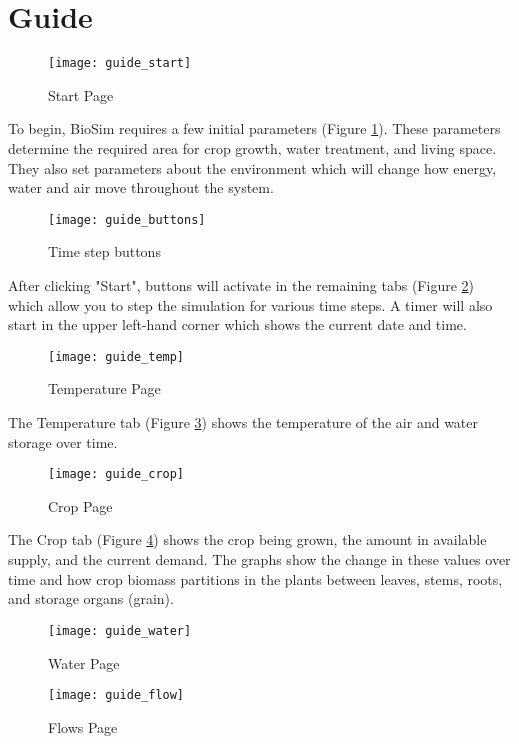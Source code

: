 \part{Guide}
\begin{figure}[h]
    \centering
    \texttt{[image: guide\_start]}
    \caption{Start Page}
    \label{fig:guide_start}
\end{figure}
To begin, BioSim requires a few initial parameters (Figure \ref{fig:guide_start}). These parameters determine the required area for crop growth, water treatment, and living space. They also set parameters about the environment which will change how energy, water and air move throughout the system. 

\begin{figure}[p]
    \centering
    \texttt{[image: guide\_buttons]}
    \caption{Time step buttons}
    \label{fig:guide_buttons}
\end{figure}

After clicking "Start", buttons will activate in the remaining tabs (Figure \ref{fig:guide_buttons}) which allow you to step the simulation for various time steps. A timer will also start in the upper left-hand corner which shows the current date and time.

\begin{figure}[p]
    \centering
    \texttt{[image: guide\_temp]}
    \caption{Temperature Page}
    \label{fig:guide_temp}
\end{figure}

The Temperature tab (Figure \ref{fig:guide_temp}) shows the temperature of the air and water storage over time.

\begin{figure}[p]
    \centering
    \texttt{[image: guide\_crop]}
    \caption{Crop Page}
    \label{fig:guide_crop}
\end{figure}

The Crop tab (Figure \ref{fig:guide_crop}) shows the crop being grown, the amount in available supply, and the current demand. The graphs show the change in these values over time and how crop biomass partitions in the plants between leaves, stems, roots, and storage organs (grain).

\begin{figure}[p]
    \centering
    \texttt{[image: guide\_water]}
    \caption{Water Page}
    \label{fig:guide_water}
\end{figure}
\begin{figure}[p]
    \centering
    \texttt{[image: guide\_flow]}
    \caption{Flows Page}
    \label{fig:guide_flow}
\end{figure}

